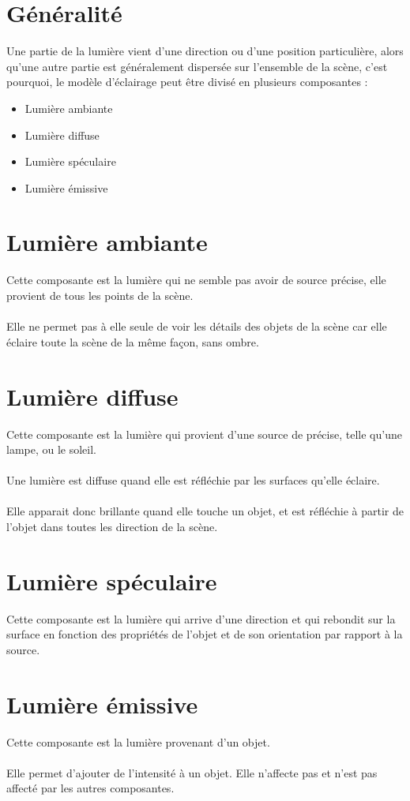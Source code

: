 \section{Généralité}
Une partie de la lumière vient d’une direction ou d’une position particulière, alors
qu’une autre partie est généralement dispersée sur l’ensemble de la scène, c'est pourquoi, le modèle d'éclairage peut être divisé en plusieurs composantes : 
\begin{itemize}
\item Lumière ambiante
\item Lumière diffuse
\item Lumière spéculaire
\item Lumière émissive
\end{itemize}

\section{Lumière ambiante}
Cette composante est la lumière qui ne semble pas avoir de source précise, elle provient de tous les points de la scène.
\\\\
Elle ne permet pas à elle seule de voir les détails des objets de la scène car elle éclaire toute la scène de la même façon, sans ombre.

\section{Lumière diffuse}
Cette composante est la lumière qui provient d'une source de précise, telle qu'une lampe, ou le soleil.
\\\\
Une lumière est diffuse quand elle est réfléchie par les surfaces qu'elle éclaire.
\\\\
Elle apparait donc brillante quand elle touche un objet, et est réfléchie à partir de l'objet dans toutes les direction de la scène.

\section{Lumière spéculaire}
Cette composante est la lumière qui arrive d'une direction et qui rebondit sur la surface en fonction des propriétés de l'objet et de son orientation par rapport à la source.

\section{Lumière émissive}
Cette composante est la lumière provenant d'un objet.
\\\\
Elle permet d'ajouter de l'intensité à un objet.
Elle n'affecte pas et n'est pas affecté par les autres composantes.